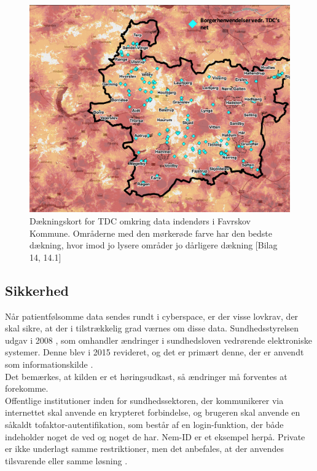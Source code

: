 \begin{figure}[H]
\centering
\includegraphics[width=1\textwidth]{Figurer/Snip20160526_3}
\caption{\label{fig:dkort}Dækningskort for TDC omkring data indendørs i Favrskov Kommune. Områderne med den mørkerøde farve har den bedste dækning, hvor imod jo lysere områder jo dårligere dækning  [Bilag 14, 14.1]}
\end{figure}

\subsection{Sikkerhed}
Når patientfølsomme data sendes rundt i cyberspace, er der visse lovkrav, der skal sikre, at der i tilstrækkelig grad værnes om disse data.
Sundhedsstyrelsen udgav i 2008 , som omhandler ændringer i sundhedsloven vedrørende elektroniske systemer. Denne blev i 2015 revideret, og det er primært denne, der er anvendt som informationskilde \cite{vogi}.\\
Det bemærkes, at kilden er et høringsudkast, så ændringer må forventes at forekomme.\\
Offentlige institutioner inden for sundhedssektoren, der kommunikerer via internettet skal anvende en krypteret forbindelse, og brugeren skal anvende en såkaldt tofaktor-autentifikation, som består af en login-funktion, der både indeholder noget de ved og noget de har. Nem-ID er et eksempel herpå. Private er ikke underlagt samme restriktioner, men det anbefales, at der anvendes tilsvarende eller samme løsning \cite{vogi}.


